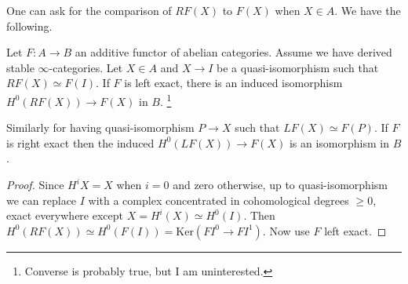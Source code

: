 \documentclass{article}
\begin{document}
One can ask for the comparison of $RF(X)$ to $F(X)$
when $X \in A$. We have the following.
\begin{prop}
  Let $F : A \to B$ an additive functor of abelian categories.
  Assume we have derived stable $\infty$-categories.
  Let $X \in A$ and $X \to I$ be a quasi-isomorphism
  such that $RF(X) \simeq F(I)$.
  If $F$ is left exact, 
  there is an induced isomorphism $H^0(RF(X)) \to F(X)$ in $B$.
  \footnote{Converse is probably true, but I am uninterested.}

  Similarly for having quasi-isomorphism $P \to X$
  such that $LF(X) \simeq F(P)$.
  If $F$ is right exact then 
  the induced $H^0(LF(X)) \to F(X)$ is an isomorphism in $B$.
\end{prop}
\begin{proof}
  Since $H^i X = X$ when $i = 0$ and zero otherwise,
  up to quasi-isomorphism we can replace $I$ 
  with a complex concentrated in cohomological degrees 
  $\geq 0$, exact everywhere except $X = H^i(X) \simeq H^0(I)$.
  Then $H^0(RF(X)) \simeq H^0(F(I)) = \mathrm{Ker}(F I^0 \to F I^1)$.
  Now use $F$ left exact.
\end{proof}
\end{document}
